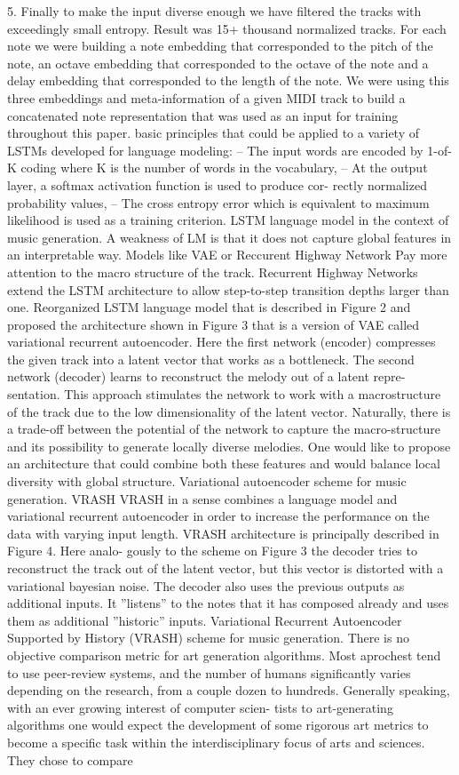 5. Finally to make the input diverse enough we have filtered the tracks with exceedingly small entropy. Result was 15+ thousand normalized tracks. For each note we were building a note embedding that corresponded to the pitch of the note, an octave embedding that corresponded to the octave of the note and a delay embedding that corresponded to the length of the note. We were using this three embeddings and meta-information of a given MIDI track to build a concatenated note representation that was used as an input for training throughout this paper. basic principles that could be applied to a variety of LSTMs developed for language modeling: – The input words are encoded by 1-of-K coding where K is the number of words in the vocabulary, – At the output layer, a softmax activation function is used to produce cor- rectly normalized probability values, – The cross entropy error which is equivalent to maximum likelihood is used as a training criterion. LSTM language model in the context of music generation. A weakness of LM is that it does not capture global features in an interpretable way. Models like VAE or Reccurent Highway Network Pay more attention to the macro structure of the track. Recurrent Highway Networks extend the LSTM architecture to allow step-to-step transition depths larger than one. Reorganized LSTM language model that is described in Figure 2 and proposed the architecture shown in Figure 3 that is a version of VAE called variational recurrent autoencoder. Here the first network (encoder) compresses the given track into a latent vector that works as a bottleneck. The second network (decoder) learns to reconstruct the melody out of a latent repre- sentation. This approach stimulates the network to work with a macrostructure of the track due to the low dimensionality of the latent vector. Naturally, there is a trade-off between the potential of the network to capture the macro-structure and its possibility to generate locally diverse melodies. One would like to propose an architecture that could combine both these features and would balance local diversity with global structure. Variational autoencoder scheme for music generation. VRASH VRASH in a sense combines a language model and variational recurrent autoencoder in order to increase the performance on the data with varying input length. VRASH architecture is principally described in Figure 4. Here analo- gously to the scheme on Figure 3 the decoder tries to reconstruct the track out of the latent vector, but this vector is distorted with a variational bayesian noise. The decoder also uses the previous outputs as additional inputs. It ”listens” to the notes that it has composed already and uses them as additional ”historic” inputs. Variational Recurrent Autoencoder Supported by History (VRASH) scheme for music generation. There is no objective comparison metric for art generation algorithms. Most aprochest tend to use peer-review systems, and the number of humans significantly varies depending on the research, from a couple dozen to hundreds. Generally speaking, with an ever growing interest of computer scien- tists to art-generating algorithms one would expect the development of some rigorous art metrics to become a specific task within the interdisciplinary focus of arts and sciences. They chose to compare 